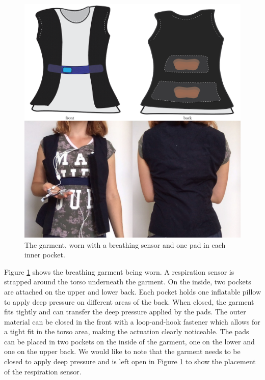  \begin{figure}[t]
  \centering
    \includegraphics[width=0.8\linewidth]{Chapters/Figures/soma_chi/fig_5_all_grid.png}
  \caption{The garment, worn with a breathing sensor and one pad in each inner pocket.}
  \label{fig:garment}
\end{figure}

Figure \ref{fig:garment} shows the breathing garment being worn. A respiration sensor is strapped around the torso underneath the garment. On the inside, two pockets are attached on the upper and lower back. Each pocket holds one inflatable pillow to apply deep pressure on different areas of the back. When closed, the garment fits tightly and can transfer the deep pressure applied by the pads. The outer material can be closed in the front with a loop-and-hook fastener which allows for a tight fit in the torso area, making the actuation clearly noticeable. The pads can be placed in two pockets on the inside of the garment, one on the lower and one on the upper back. We would like to note that the garment needs to be closed to apply deep pressure and is left open in Figure \ref{fig:garment} to show the placement of the respiration sensor.


